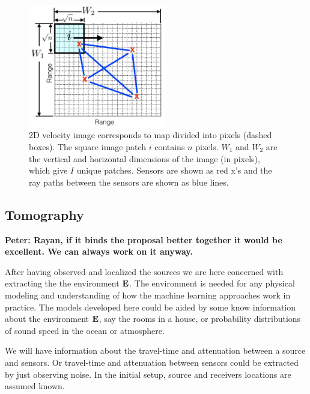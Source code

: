 \begin{figure}[t]
\centering
\includegraphics[width=6cm]{figs/patch.png} 
\caption{2D velocity image corresponds to  map divided into pixels (dashed boxes). The square image patch $i$ contains $n$ pixels. $W_1$ and $W_2$ are the vertical and horizontal dimensions of the image (in pixels), which give $I$ unique patches. Sensors are shown as red x's and the ray paths between the sensors are shown as blue lines.}
\label{fig:patchMap}
\end{figure}
\subsection{Tomography}
{\bf Peter: Rayan, if it binds the proposal better together it would be excellent. We can always work on it anyway.}

After having observed and localized the sources we are here concerned with extracting the the environment $\bf E$. The environment is needed for any physical modeling and understanding of how the machine learning approaches work in practice. The models developed here could be aided by some know information about the environment $\bf E$, say the rooms in a house, or probability distributions of sound speed in the ocean or atmosphere.

We will have information about the travel-time and attenuation between a source and sensors. Or  travel-time and attenuation between sensors could be extracted by just observing noise\cite{shapiro2005, sabra2005, gerstoft2006}. In the initial setup, source and receivers locations are assumed known. 

